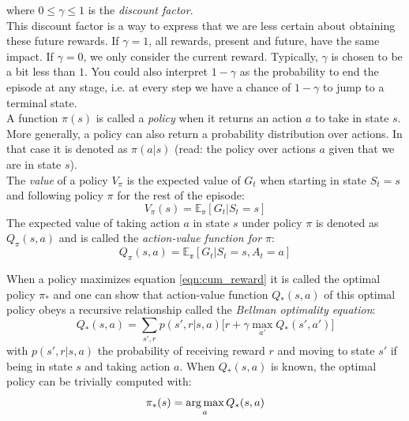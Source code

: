 where $0 \leqslant \gamma \leqslant 1$ is the \emph{discount factor}.\\
This discount factor is a way to express that we are less certain about obtaining these future rewards. If $\gamma = 1$, all rewards, present and future, have the same impact. If $\gamma=0$, we only consider the current reward. Typically, $\gamma$ is chosen to be a bit less than $1$.
You could also interpret $1-\gamma$ as the probability to end the episode at any stage, i.e. at every step we have a chance of $1-\gamma$ to jump to a terminal state. \\
A function $\pi(s)$ is called a \emph{policy} when it returns an action $a$ to take in state $s$. More generally, a policy can also return a probability distribution over actions. In that case it is denoted as $\pi(a|s)$ (read: the policy over actions $a$ given that we are in state $s$).\\
The \emph{value} of a policy $V_{\pi}$ is the expected value of $G_t$ when starting in state $S_t=s$ and following policy $\pi$ for the rest of the episode:
\begin{equation}
    V_{\pi}(s) = \mathbb{E_{\pi}}[G_t | S_t=s]
     \label{eq:definition_V}
\end{equation}
The expected value of taking action $a$ in state $s$ under policy $\pi$ is denoted as $Q_{\pi}(s,a)$ and is called the \emph{action-value function for $\pi$}:
\begin{equation}
    Q_{\pi}(s,a) = \mathbb{E_{\pi}}[G_t | S_t=s, A_t = a]
    \label{eq:definition_Q}
\end{equation}

When a policy maximizes equation \ref{eqn:cum_reward} it is called the optimal policy $\pi_{*}$ and one can show that action-value function $Q_{*}(s, a)$ of this optimal policy obeys a recursive relationship called the \emph{Bellman optimality equation}:
\begin{equation}
    Q_{*}(s,a) = \sum_{s', r} p(s', r | s, a) \big[r + \gamma \max_{a'} Q_{*}(s', a') \big]
    \label{eqn:bellman}
\end{equation}
with $p(s', r | s, a)$ the probability of receiving reward $r$ and moving to state $s'$ if being in state $s$ and taking action $a$. When $Q_{*}(s,a)$ is known, the optimal policy can be trivially computed with:
\begin{equation}
    \pi_{*}(s) = \operatorname*{arg\,max}_{a} Q_{*}(s, a)
    \label{eq:optimal_policy}
\end{equation}

